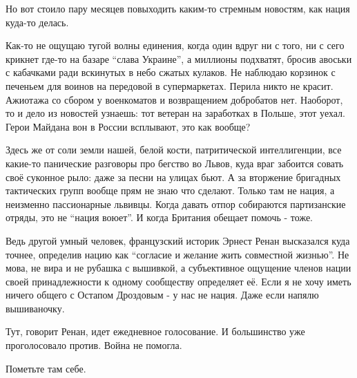 Но вот стоило пару месяцев повыходить каким-то стремным новостям, как нация
куда-то делась. 

Как-то не ощущаю тугой волны единения, когда один вдруг ни с того, ни с сего
крикнет где-то на базаре \enquote{слава Украине}, а миллионы подхватят, бросив авоськи
с кабачками ради вскинутых в небо сжатых кулаков. Не наблюдаю корзинок с
печеньем для воинов на передовой в супермаркетах. Перила никто не красит.
Ажиотажа со сбором у военкоматов и возвращением добробатов нет. Наоборот, то и
дело из новостей узнаешь: тот ветеран на заработках в Польше, этот уехал. Герои
Майдана вон в России всплывают, это как вообще?

Здесь же от соли земли нашей, белой кости, патритической интеллигенции, все
какие-то панические разговоры про бегство во Львов, куда враг забоится совать
своё суконное рыло: даже за песни на улицах бьют. А за вторжение бригадных
тактических групп вообще прям не знаю что сделают. Только там не нация, а
неизменно пассионарные львивцы. Когда давать отпор собираются партизанские
отряды, это не \enquote{нация воюет}. И когда Британия обещает помочь - тоже. 

Ведь другой умный человек, французский историк Эрнест Ренан высказался куда
точнее, определив нацию как \enquote{согласие и желание жить совместной жизнью}. Не
мова, не вира и не рубашка с вышивкой, а субъективное ощущение членов нации
своей принадлежности к одному сообществу определяет её. Если я не хочу иметь
ничего общего с Остапом Дроздовым - у нас не нация. Даже если напялю
вышиваночку. 

Тут, говорит Ренан, идет ежедневное голосование. И большинство уже
проголосовало против. Война не помогла.

Пометьте там себе.

